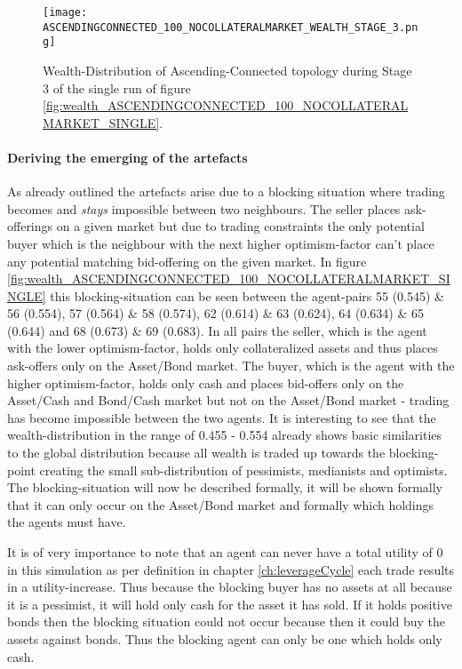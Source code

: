 \documentclass[Bachelorarbeit.tex]{subfiles}
\begin{document}
\begin{figure}[H]
	\centering
  \texttt{[image: ASCENDINGCONNECTED\_100\_NOCOLLATERALMARKET\_WEALTH\_STAGE\_3.png]}
  	\caption{Wealth-Distribution of Ascending-Connected topology during Stage 3 of the single run of figure \ref{fig:wealth_ASCENDINGCONNECTED_100_NOCOLLATERALMARKET_SINGLE}.}
	\label{fig:markets_ASCENDINGCONNECTED_100_NOCOLLATERALMARKET_WEALTH_STAGE_3}
\end{figure}

\paragraph{Deriving the emerging of the artefacts}
As already outlined the artefacts arise due to a blocking situation where trading becomes and \textit{stays} impossible between two neighbours. The seller places ask-offerings on a given market but due to trading constraints the only potential buyer which is the neighbour with the next higher optimism-factor can't place any potential matching bid-offering on the given market. In figure \ref{fig:wealth_ASCENDINGCONNECTED_100_NOCOLLATERALMARKET_SINGLE} this blocking-situation can be seen between the agent-pairs 55 (0.545) \& 56 (0.554), 57 (0.564) \& 58 (0.574), 62 (0.614) \& 63 (0.624), 64 (0.634) \& 65 (0.644) and 68 (0.673) \& 69 (0.683). In all pairs the seller, which is the agent with the lower optimism-factor, holds only collateralized assets and thus places ask-offers only on the Asset/Bond market. The buyer, which is the agent with the higher optimism-factor, holds only cash and places bid-offers only on the Asset/Cash and Bond/Cash market but not on the Asset/Bond market - trading has become impossible between the two agents. It is interesting to see that the wealth-distribution in the range of 0.455 - 0.554 already shows basic similarities to the global distribution because all wealth is traded up towards the blocking-point creating the small sub-distribution of pessimists, medianists and optimists. The blocking-situation will now be described formally, it will be shown formally that it can only occur on the Asset/Bond market and formally which holdings the agents must have.

\medskip

It is of very importance to note that an agent can never have a total utility of 0 in this simulation as per definition in chapter \ref{ch:leverageCycle} each trade results in a utility-increase. Thus because the blocking buyer has no assets at all because it is a pessimist, it will hold only cash for the asset it has sold. If it holds positive bonds then the blocking situation could not occur because then it could buy the assets against bonds. Thus the blocking agent can only be one which holds only cash.
\end{document}
